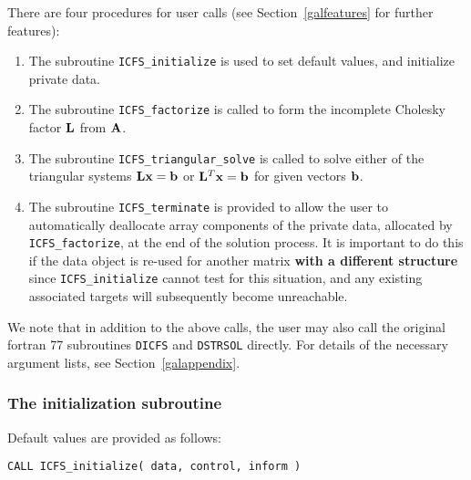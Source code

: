 \documentclass{galahad}
\newcommand{\packagename}{ICFS}
\begin{document}

\galarguments
There are four procedures for user calls
(see Section~\ref{galfeatures} for further features):

\begin{enumerate}
\item The subroutine
      {\tt \packagename\_initialize}
      is used to set default values, and initialize private data.
\item The subroutine
      {\tt \packagename\_factorize}
      is called to form the incomplete Cholesky factor ${\mathbf{L}}$ from ${\mathbf{A}}$.
\item The subroutine
      {\tt \packagename\_triangular\_solve}
      is called to solve either of the triangular systems
      ${\mathbf{L}} {\mathbf{x}} = {\mathbf{b}}$ or ${\mathbf{L}}^T {\mathbf{x}} = {\mathbf{b}}$
      for given vectors ${\mathbf{b}}$.
\item The subroutine
      {\tt \packagename\_terminate}
      is provided to allow the user to automatically deallocate array
       components of the private data, allocated by
       {\tt \packagename\_factorize},
       at the end of the solution process.
       It is important to do this if the data object is re-used for another
       matrix {\bf with a different structure}
       since {\tt \packagename\_initialize} cannot test for this situation,
       and any existing associated targets will subsequently become unreachable.
\end{enumerate}

\noindent
We note that in addition to the above calls, the user may also call the
original fortran 77 subroutines {\tt DICFS} and {\tt DSTRSOL} directly.
For details of the necessary argument lists, see Section~\ref{galappendix}.



\subsubsection{The initialization subroutine}\label{subinit}
 Default values are provided as follows:
\vspace*{1mm}

\hspace{8mm}
{\tt CALL \packagename\_initialize( data, control, inform )}
\end{document}
